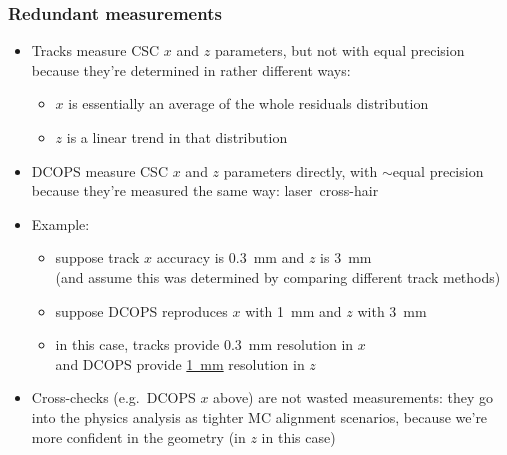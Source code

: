 \documentclass[compress]{beamer}
\begin{document}
\begin{frame}
\frametitle{Redundant measurements}
\begin{itemize}\setlength{\itemsep}{0.25 cm}
\item Tracks measure CSC $x$ and $z$ parameters, but not with equal
  precision because they're determined in rather different ways:
\begin{itemize}\setlength{\itemsep}{0.1 cm}
\item $x$ is essentially an average of the whole residuals distribution
\item $z$ is a linear trend in that distribution
\end{itemize}


\item DCOPS measure CSC $x$ and $z$ parameters directly, with $\sim$equal precision because they're measured the same way: \mbox{laser cross-hair\hspace{-1 cm}}

\item Example:
\begin{itemize}\setlength{\itemsep}{0.1 cm}
\item suppose track $x$ accuracy is 0.3~mm and $z$ is 3~mm \\
{\scriptsize (and assume this was determined by comparing different track methods)}
\item suppose DCOPS reproduces $x$ with 1~mm and $z$ with 3~mm
\item in this case, tracks provide 0.3~mm resolution in $x$ \\ and DCOPS provide \underline{1~mm} resolution in $z$
\end{itemize}

\item Cross-checks (e.g.\ DCOPS $x$ above) are not wasted measurements: they
  go into the physics analysis as tighter MC alignment scenarios,
  because we're more confident in the geometry (in $z$ in this case)

\end{itemize}
\end{frame}
\end{document}
